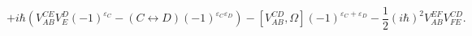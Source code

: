 \begin{equation}\label{21}
+i\hbar(V^{CE}_{AB}V^D_E(-1)^{\varepsilon_C}
-(C\leftrightarrow D)(-1)^{\varepsilon_C\varepsilon_D})-
[V^{CD}_{AB},\Omega](-1)^{\varepsilon_C+\varepsilon_D}-
\frac{1}{2}(i\hbar)^2V^{EF}_{AB}V^{CD}_{FE}.
\end{equation}

